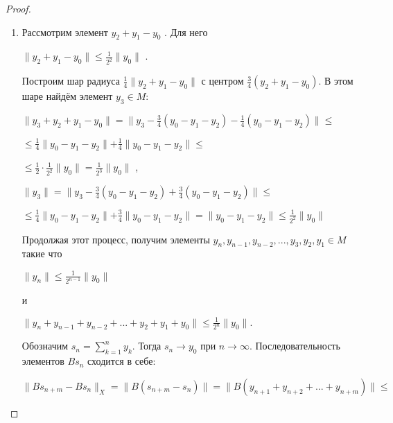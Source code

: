 \documentclass[12pt,a4paper,titlepage,oneside]{book}
\theoremstyle{definition}
\theoremstyle{plain}
\theoremstyle{remark}
\theoremstyle{remark}
\theoremstyle{remark}
\theoremstyle{remark}
\theoremstyle{plain}
\theoremstyle{plain}
\begin{document}
\begin{proof}
\begin{enumerate}
	\item Рассмотрим элемент $y_2+y_1- y_0$ . Для него 	\begin{center}	
	$\parallel y_2+y_1- y_0 \parallel \leq
	\frac{1}{2^2} \parallel y_0 \parallel$ .
	\end{center}
	Построим шар радиуса
	$\frac{1}{4} \parallel y_2 + y_1 - y_0 \parallel$      	с центром $\frac{3}{4}(y_2 + y_1 - y_0)$.
	В этом шаре найдём элемент 	$y_3 \in M$:
	\begin{center}
	$\parallel y_3 + y_2 + y_1 - y_0 \parallel =
	\parallel y_3 - \frac{3}{4}(y_0 - y_1 - y_2) -
	\frac{1}{4}(y_0 - y_1 - y_2) \parallel \leq $
	\end{center}
	\begin{center}
	$\leq \frac{1}{4} \parallel y_0 - y_1 - y_2 \parallel +
	\frac{1}{4} \parallel y_0 - y_1 - y_2 \parallel 			\leq $
	\end{center}
	\begin{center}
	$ \leq\frac{1}{2} \cdot
	\frac{1}{2^2} \parallel y_0 \parallel =
	\frac{1}{2^3} \parallel y_0 \parallel$ ,
	\end{center}
	\begin{center}
	$\parallel y_3 \parallel =
	\parallel y_3 - \frac{3}{4}(y_0 - y_1 - y_2) +
	\frac{3}{4}(y_0 - y_1 - y_2) \parallel \leq $
	\end{center}
	\begin{center}
	$\leq \frac{1}{4} \parallel y_0 - y_1 - y_2 				\parallel +
	\frac{3}{4} \parallel y_0 - y_1 - y_2 \parallel =
	 \parallel y_0 - y_1 - y_2 \parallel \leq
	 \frac{1}{2^2} \parallel y_0 \parallel$
	\end{center}

Продолжая этот процесс, получим элементы $y_n, y_{n-1}, y_{n-2}, ..., y_3, y_2, y_1 \in M$ такие что 

\begin{center}
$\lVert y_n \rVert \leq \frac{1}{2^{n-1}} \lVert y_0 \rVert$

и

$\lVert y_n + y_{n-1}+y_{n-2}+...+y_2+y_1+y_0 \rVert \leq \frac{1}{2^n} \lVert y_0 \rVert.$
\end{center}

Обозначим $s_n= \displaystyle\sum\limits_{k=1}^n y_k$. Тогда $s_n \to y_0$ при $n \to \infty$. Последовательность элементов $B s_n$ сходится в себе:

\begin{center}
$ \lVert B s_{n+m}-B s_n \rVert _X = \lVert B(s_{n+m}-s_n) \rVert= \lVert B(y_{n+1}+y_{n+2}+...+y_{n+m}) \rVert \leq $
\end{center}


\end{enumerate}
\end{proof}
\end{document}
